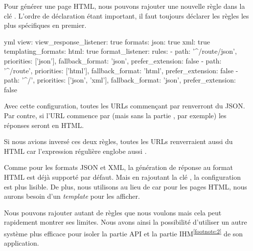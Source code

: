 \documentclass[big]{zmdocument}
\begin{document}
Pour générer une page HTML, nous pouvons rajouter une nouvelle règle dans la clé . L'ordre de déclaration étant important, il faut toujours déclarer les règles les plus spécifiques en premier.



\begin{CodeBlock}{yml}
view:
        view_response_listener: true
        formats:
            json: true
            xml: true
        templating_formats:
            html: true
    format_listener:
        rules:
            - { path: '^/route/json', priorities: ['json'], fallback_format: 'json', prefer_extension: false }
            - { path: '^/route', priorities: ['html'], fallback_format: 'html', prefer_extension: false }
            - { path: '^/', priorities: ['json', 'xml'], fallback_format: 'json', prefer_extension: false }
\end{CodeBlock}



Avec cette configuration, toutes les URLs commençant par  renverront du JSON. Par contre, si l'URL commence par  (mais sans la partie ,  par exemple) les réponses seront en HTML.



Si nous avions inversé ces deux règles, toutes les URLs  renverraient aussi du HTML car l'expression régulière  englobe aussi .



\begin{Information}
Comme pour les formats JSON et XML, la génération de réponse au format HTML est déjà supporté par défaut. Mais en rajoutant la clé , la configuration est plus lisible. De plus, nous utilisons  au lieu de  car pour les pages HTML, nous aurons besoin d'un \textit{template} pour les afficher.
\end{Information}


Nous pouvons rajouter autant de règles que nous voulons mais cela peut rapidement montrer ses limites. Nous avons ainsi la possibilité d'utiliser un autre système plus efficace pour isoler la partie API et la partie IHM\textsuperscript{\ref{footnote:2}} de son application.
\end{document}
